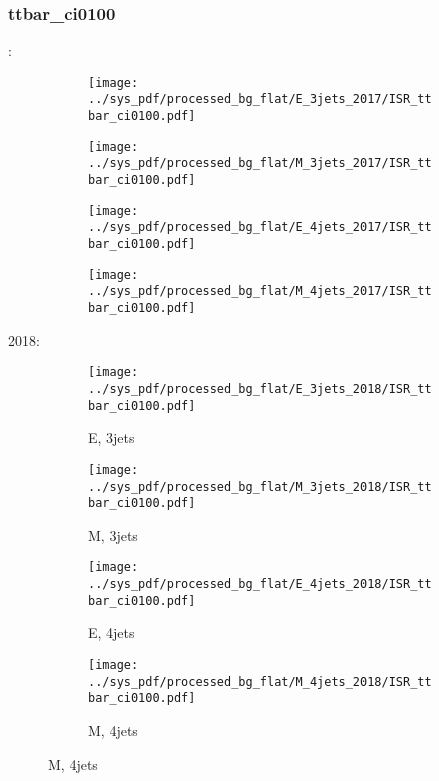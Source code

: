 \documentclass{beamer}
\begin{document}
\begin{frame}
\frametitle{ttbar_ci0100}
\fontsize{5}{1}:
\begin{figure}
\centering
\begin{subfigure}[b]{0.24\textwidth}
\texttt{[image: ../sys\_pdf/processed\_bg\_flat/E\_3jets\_2017/ISR\_ttbar\_ci0100.pdf]}
\end{subfigure}
\begin{subfigure}[b]{0.24\textwidth}
\texttt{[image: ../sys\_pdf/processed\_bg\_flat/M\_3jets\_2017/ISR\_ttbar\_ci0100.pdf]}
\end{subfigure}
\begin{subfigure}[b]{0.24\textwidth}
\texttt{[image: ../sys\_pdf/processed\_bg\_flat/E\_4jets\_2017/ISR\_ttbar\_ci0100.pdf]}
\end{subfigure}
\begin{subfigure}[b]{0.24\textwidth}
\texttt{[image: ../sys\_pdf/processed\_bg\_flat/M\_4jets\_2017/ISR\_ttbar\_ci0100.pdf]}
\end{subfigure}
\end{figure}
2018:
\begin{figure}
\centering
\begin{subfigure}[b]{0.24\textwidth}
\texttt{[image: ../sys\_pdf/processed\_bg\_flat/E\_3jets\_2018/ISR\_ttbar\_ci0100.pdf]}
\captionsetup{font=tiny}
\caption{E, 3jets}
\end{subfigure}
\begin{subfigure}[b]{0.24\textwidth}
\texttt{[image: ../sys\_pdf/processed\_bg\_flat/M\_3jets\_2018/ISR\_ttbar\_ci0100.pdf]}
\captionsetup{font=tiny}
\caption{M, 3jets}
\end{subfigure}
\begin{subfigure}[b]{0.24\textwidth}
\texttt{[image: ../sys\_pdf/processed\_bg\_flat/E\_4jets\_2018/ISR\_ttbar\_ci0100.pdf]}
\captionsetup{font=tiny}
\caption{E, 4jets}
\end{subfigure}
\begin{subfigure}[b]{0.24\textwidth}
\texttt{[image: ../sys\_pdf/processed\_bg\_flat/M\_4jets\_2018/ISR\_ttbar\_ci0100.pdf]}
\captionsetup{font=tiny}
\caption{M, 4jets}
\end{subfigure}
\end{figure}
\end{frame}
\end{document}
